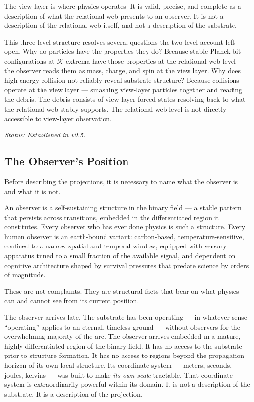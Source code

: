 \documentclass[11pt,letterpaper]{article}
\newcommand{\Kappa}{\mathcal{K}}
\begin{document}
The view layer is where physics operates. It is valid, precise, and complete as a description of what the relational web presents to an observer. It is not a description of the relational web itself, and not a description of the substrate.

This three-level structure resolves several questions the two-level account left open. Why do particles have the properties they do? Because stable Planck bit configurations at \(\Kappa\) extrema have those properties at the relational web level --- the observer reads them as mass, charge, and spin at the view layer. Why does high-energy collision not reliably reveal substrate structure? Because collisions operate at the view layer --- smashing view-layer particles together and reading the debris. The debris consists of view-layer forced states resolving back to what the relational web stably supports. The relational web level is not directly accessible to view-layer observation.

\emph{Status: Established in v0.5.}

\subsection{The Observer's Position}
\label{sec:org918a49e}

Before describing the projections, it is necessary to name what the observer is and what it is not.

An observer is a self-sustaining structure in the binary field --- a stable pattern that persists across transitions, embedded in the differentiated region it constitutes. Every observer who has ever done physics is such a structure. Every human observer is an earth-bound variant: carbon-based, temperature-sensitive, confined to a narrow spatial and temporal window, equipped with sensory apparatus tuned to a small fraction of the available signal, and dependent on cognitive architecture shaped by survival pressures that predate science by orders of magnitude.

These are not complaints. They are structural facts that bear on what physics can and cannot see from its current position.

The observer arrives late. The substrate has been operating --- in whatever sense ``operating'' applies to an eternal, timeless ground --- without observers for the overwhelming majority of the arc. The observer arrives embedded in a mature, highly differentiated region of the binary field. It has no access to the substrate prior to structure formation. It has no access to regions beyond the propagation horizon of its own local structure. Its coordinate system --- meters, seconds, joules, kelvins --- was built to make \emph{its own scale} tractable. That coordinate system is extraordinarily powerful within its domain. It is not a description of the substrate. It is a description of the projection.
\end{document}
